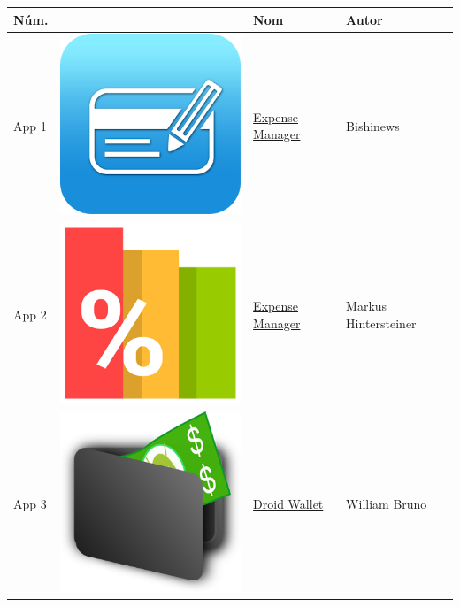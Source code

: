 \begin{tabular}{ | l | c | l | l | }
\hline
\textbf{Núm.} &  & \textbf{Nom} & \textbf{Autor} \\
\hline
App 1 & \includegraphics[scale=0.05]{A01_icon.png} & \href{https://play.google.com/store/apps/details?id=com.expensemanager}{Expense Manager} & Bishinews \\

App 2 & \includegraphics[scale=0.05]{A02_icon.png} & \href{https://play.google.com/store/apps/details?id=at.markushi.expensemanager}{Expense Manager} & Markus Hintersteiner \\

App 3 & \includegraphics[scale=0.05]{A03_icon.png} & \href{https://play.google.com/store/apps/details?id=com.bruno.myapps.droidwallet}{Droid Wallet} & William Bruno \\


\end{tabular}
